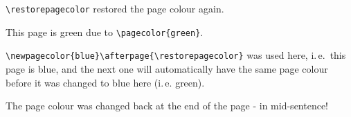 \documentclass[british]{article}[2007/10/19]%
\begin{document}
\pagebreak
\restorepagecolor

{\color{white}\verb|\restorepagecolor| restored the page colour again.}

\pagebreak
\pagecolor{green}

This page is green due to \verb|\pagecolor{green}|.

\pagebreak
{}\afterpage{\restorepagecolor}

{\color{white}\verb|\newpagecolor{blue}\afterpage{\restorepagecolor}|%
\newline
was used here, i.\,e.~this page is blue, and the next one will
automatically have the same page colour before it was changed to blue
here (i.\,e. green).}

\smallskip
{\color{red}\textbf{\lipsum[1-11]}}
\bigskip

The page colour was changed back at the end of the page -
in mid-sentence!
\end{document}
